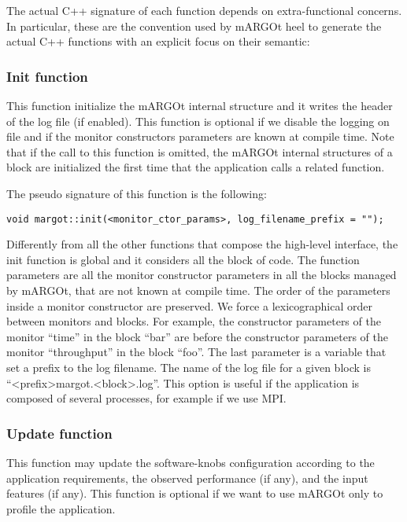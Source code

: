 The actual C++ signature of each function depends on extra-functional concerns.
In particular, these are the convention used by mARGOt heel to generate the actual C++ functions with an explicit focus on their semantic:


\subsubsection*{Init function}

This function initialize the mARGOt internal structure and it writes the header of the log file (if enabled).
This function is optional if we disable the logging on file and if the monitor constructors parameters are known at compile time.
Note that if the call to this function is omitted, the mARGOt internal structures of a block are initialized the first time that the application calls a related function.

The pseudo signature of this function is the following:
\begin{lstlisting}
void margot::init(<monitor_ctor_params>, log_filename_prefix = "");
\end{lstlisting}
Differently from all the other functions that compose the high-level interface, the init function is global and it considers all the block of code.
The function parameters are all the monitor constructor parameters in all the blocks managed by mARGOt, that are not known at compile time.
The order of the parameters inside a monitor constructor are preserved.
We force a lexicographical order between monitors and blocks.
For example, the constructor parameters of the monitor ``time'' in the block ``bar'' are before the constructor parameters of the monitor ``throughput'' in the block ``foo''.
The last parameter is a variable that set a prefix to the log filename.
The name of the log file for a given block is ``<prefix>margot.<block>.log''.
This option is useful if the application is composed of several processes, for example if we use MPI.




\subsubsection*{Update function}

This function may update the software-knobs configuration according to the application requirements, the observed performance (if any), and the input features (if any).
This function is optional if we want to use mARGOt only to profile the application.

